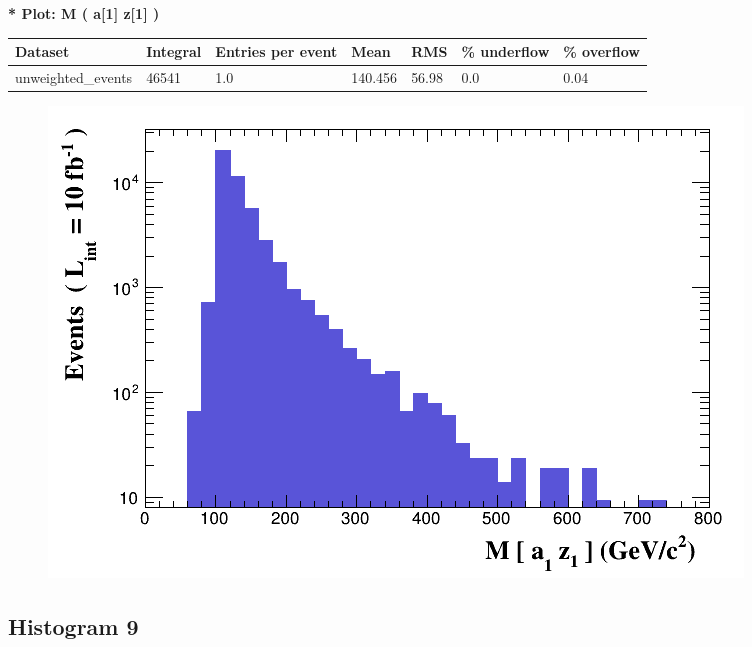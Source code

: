 \documentclass[a4paper, 10pt]{article}
\begin{document}
\textbf{* Plot: M ( a[1] z[1] ) }\\
   \begin{table}[H]
  \begin{center}
    \begin{tabular}{|m{23.0mm}|m{23.0mm}|m{18.0mm}|m{19.0mm}|m{19.0mm}|m{19.0mm}|m{19.0mm}|}
      \hline
      {\cellcolor{yellow}         Dataset}& {\cellcolor{yellow}         Integral}& {\cellcolor{yellow}         Entries per event}& {\cellcolor{yellow}         Mean}& {\cellcolor{yellow}         RMS}& {\cellcolor{yellow}         \% underflow}& {\cellcolor{yellow}         \% overflow}\\
      \hline
      {\cellcolor{white}         unweighted\_events}& {\cellcolor{white}         46541}& {\cellcolor{white}         1.0}& {\cellcolor{white}         140.456}& {\cellcolor{white}         56.98}& {\cellcolor{green}         0.0}& {\cellcolor{green}         0.04}\\
\hline
    \end{tabular}
  \end{center}
\end{table}

\begin{figure}[H]
  \begin{center}
    \includegraphics[scale=0.45]{selection_7.png}\\
\caption{   }
  \end{center}
\end{figure}
      \newpage
\subsection{ Histogram 9}
\end{document}
